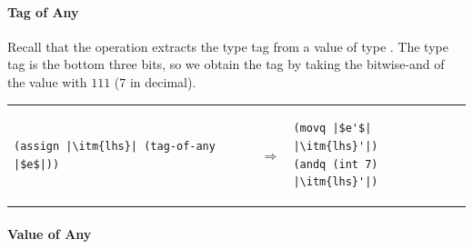 \documentclass[11pt]{book}
\begin{document}
\paragraph{Tag of Any}

Recall that the  operation extracts the type tag from
a value of type . The type tag is the bottom three bits, so
we obtain the tag by taking the bitwise-and of the value with $111$
($7$ in decimal).

\begin{tabular}{lll}
\begin{minipage}{0.4\textwidth}
\begin{lstlisting}
(assign |\itm{lhs}| (tag-of-any |$e$|))
\end{lstlisting}
\end{minipage}
&
$\Rightarrow$
&
\begin{minipage}{0.5\textwidth}
\begin{lstlisting}
(movq |$e'$| |\itm{lhs}'|)
(andq (int 7) |\itm{lhs}'|)
\end{lstlisting}
\end{minipage}
\end{tabular}  

\paragraph{Value of Any}
\end{document}
